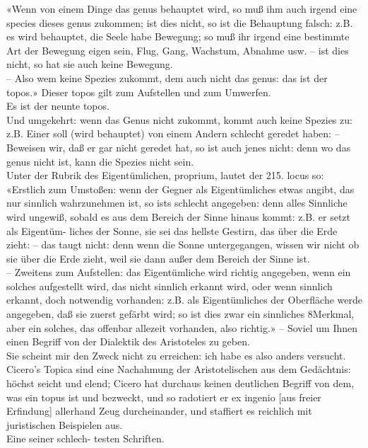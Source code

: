 \documentclass{book}
\newcommand{\de}[1]{{\color{red}#1}\\}
\begin{document}
\de{«Wenn von einem Dinge das genus behauptet
wird, so muß ihm auch irgend eine species dieses
genus zukommen; ist dies nicht, so ist die
Behauptung falsch: z.B. es wird behauptet, die
Seele habe Bewegung; so muß ihr irgend eine
bestimmte Art der Bewegung eigen sein, Flug,
Gang, Wachstum, Abnahme usw. – ist dies nicht,
so hat sie auch keine Bewegung.}
\de{– Also wem
keine Spezies zukommt, dem auch nicht das
genus: das ist der topos.» Dieser topos gilt zum
Aufstellen und zum Umwerfen.}
\de{Es ist der neunte
topos.}
\de{Und umgekehrt: wenn das Genus nicht
zukommt, kommt auch keine Spezies zu: z.B.
Einer soll (wird behauptet) von einem Andern
schlecht geredet haben: – Beweisen wir, daß er
gar nicht geredet hat, so ist auch jenes nicht:
denn wo das genus nicht ist, kann die Spezies
nicht sein.}
\de{Unter der Rubrik des Eigentümlichen,
proprium, lautet der 215. locus so: «Erstlich zum
Umstoßen: wenn der Gegner als Eigentümliches
etwas angibt, das nur sinnlich wahrzunehmen ist,
so ists schlecht angegeben: denn alles Sinnliche
wird ungewiß, sobald es aus dem Bereich der
Sinne hinaus kommt: z.B. er setzt als Eigentüm-
liches der Sonne, sie sei das hellste Gestirn, das
über die Erde zieht: – das taugt nicht: denn wenn
die Sonne untergegangen, wissen wir nicht ob sie
über die Erde zieht, weil sie dann außer dem
Bereich der Sinne ist.}
\de{– Zweitens zum Aufstellen:
das Eigentümliche wird richtig angegeben, wenn
ein solches aufgestellt wird, das nicht sinnlich
erkannt wird, oder wenn sinnlich erkannt, doch
notwendig vorhanden: z.B. als Eigentümliches
der Oberfläche werde angegeben, daß sie zuerst
gefärbt wird; so ist dies zwar ein sinnliches
8Merkmal, aber ein solches, das offenbar allezeit
vorhanden, also richtig.» – Soviel um Ihnen einen
Begriff von der Dialektik des Aristoteles zu geben.}
\de{Sie scheint mir den Zweck nicht zu erreichen: ich
habe es also anders versucht.}
\de{Cicero’s Topica sind
eine Nachahmung der Aristotelischen aus dem
Gedächtnis: höchst seicht und elend; Cicero hat
durchaus keinen deutlichen Begriff von dem, was
ein topus ist und bezweckt, und so radotiert er
ex ingenio [aus freier Erfindung] allerhand Zeug
durcheinander, und staffiert es reichlich mit
juristischen Beispielen aus.}
\de{Eine seiner schlech-
testen Schriften.}
\end{document}
